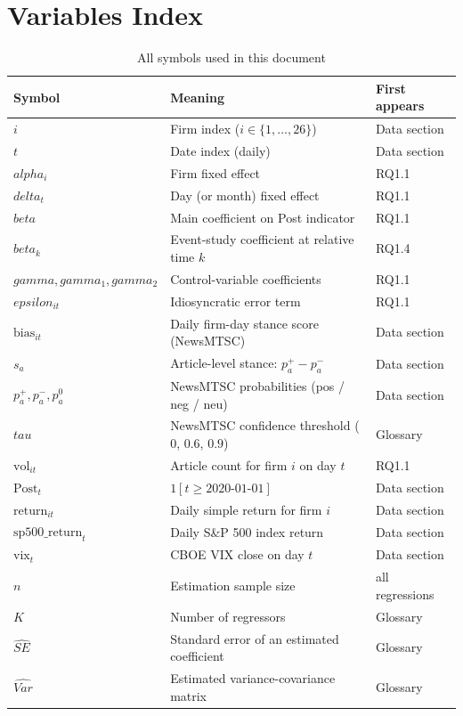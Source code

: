 \documentclass[11pt]{article}
\def\beta{beta}%
\def\alpha{alpha}%
\def\delta{delta}%
\def\gamma{gamma}%
\def\tau{tau}%
\def\varepsilon{epsilon}%
\def\mathbb#1{#1}%
\def\mathrm#1{#1}%
\newcommand{\Var}{\mathrm{Var}}
\begin{document}
\section*{Variables Index}\label{sec:vars}
\begin{table}[H]
\centering
\caption*{All symbols used in this document}
\begin{tabular}{lll}
\toprule
Symbol & Meaning & First appears \\
\midrule
$i$ & Firm index ($i \in \{1, \ldots, 26\}$) & Data section \\
$t$ & Date index (daily) & Data section \\
$\alpha_i$ & Firm fixed effect & RQ1.1 \\
$\delta_t$ & Day (or month) fixed effect & RQ1.1 \\
$\beta$ & Main coefficient on Post indicator & RQ1.1 \\
$\beta_k$ & Event-study coefficient at relative time $k$ & RQ1.4 \\
$\gamma, \gamma_1, \gamma_2$ & Control-variable coefficients & RQ1.1 \\
$\varepsilon_{it}$ & Idiosyncratic error term & RQ1.1 \\
$\text{bias}_{it}$ & Daily firm-day stance score (NewsMTSC) & Data section \\
$s_a$ & Article-level stance: $p_a^{+} - p_a^{-}$ & Data section \\
$p_a^{+}, p_a^{-}, p_a^{0}$ & NewsMTSC probabilities (pos / neg / neu) & Data section \\
$\tau$ & NewsMTSC confidence threshold ($0$, $0.6$, $0.9$) & Glossary \\
$\text{vol}_{it}$ & Article count for firm $i$ on day $t$ & RQ1.1 \\
$\text{Post}_t$ & $\mathbb{1}[t \ge 2020\text{-}01\text{-}01]$ & Data section \\
$\text{return}_{it}$ & Daily simple return for firm $i$ & Data section \\
$\text{sp500\_return}_t$ & Daily S\&P 500 index return & Data section \\
$\text{vix}_t$ & CBOE VIX close on day $t$ & Data section \\
$n$ & Estimation sample size & all regressions \\
$K$ & Number of regressors & Glossary \\
$\widehat{SE}$ & Standard error of an estimated coefficient & Glossary \\
$\widehat{\Var}$ & Estimated variance-covariance matrix & Glossary \\
\bottomrule
\end{tabular}
\end{table}
\end{document}

